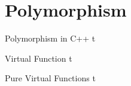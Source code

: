 \documentclass[../lecture5-objectorientation.tex]{subfiles}
\begin{document}
\section{Polymorphism}


\begin{frame}[fragile]{Polymorphism in C++}
t
\end{frame}


\begin{frame}[fragile]{Virtual Function}
t
\end{frame}


\begin{frame}[fragile]{Pure Virtual Functions}
t
\end{frame}

\end{document}
